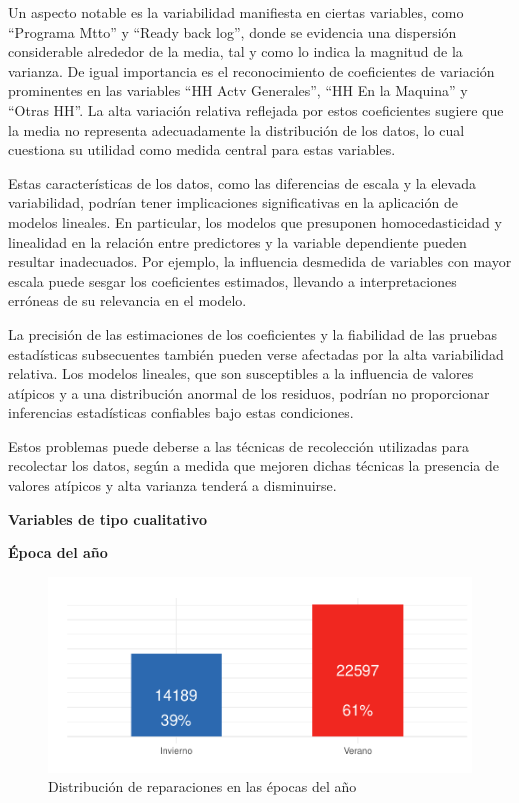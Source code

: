 \documentclass[
  11pt,
  bookmarksnumbered]{article}
\begin{document}
Un aspecto notable es la variabilidad manifiesta en ciertas variables, como ``Programa Mtto'' y ``Ready back log'', donde se evidencia una dispersión considerable alrededor de la media, tal y como lo indica la magnitud de la varianza.
De igual importancia es el reconocimiento de coeficientes de variación prominentes en las variables ``HH Actv Generales'', ``HH En la Maquina'' y ``Otras HH''.
La alta variación relativa reflejada por estos coeficientes sugiere que la media no representa adecuadamente la distribución de los datos, lo cual cuestiona su utilidad como medida central para estas variables.

Estas características de los datos, como las diferencias de escala y la elevada variabilidad, podrían tener implicaciones significativas en la aplicación de modelos lineales.
En particular, los modelos que presuponen homocedasticidad y linealidad en la relación entre predictores y la variable dependiente pueden resultar inadecuados.
Por ejemplo, la influencia desmedida de variables con mayor escala puede sesgar los coeficientes estimados, llevando a interpretaciones erróneas de su relevancia en el modelo.

La precisión de las estimaciones de los coeficientes y la fiabilidad de las pruebas estadísticas subsecuentes también pueden verse afectadas por la alta variabilidad relativa.
Los modelos lineales, que son susceptibles a la influencia de valores atípicos y a una distribución anormal de los residuos, podrían no proporcionar inferencias estadísticas confiables bajo estas condiciones.

Estos problemas puede deberse a las técnicas de recolección utilizadas para recolectar los datos, según \textcite{gujarati2009basic} a medida que mejoren dichas técnicas la presencia de valores atípicos y alta varianza tenderá a disminuirse.

\textbf{Variables de tipo cualitativo}

\textbf{Época del año}

\begin{figure}
\centering
\includegraphics{trabajo_files/figure-latex/unnamed-chunk-12-1.pdf}
\caption{\label{fig:unnamed-chunk-12}Distribución de reparaciones en las épocas del año}
\end{figure}
\end{document}
